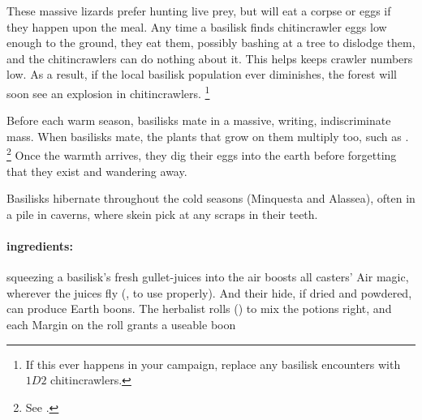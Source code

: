 \begin{multicols}{2}
These massive lizards prefer hunting live prey, but will eat a corpse or eggs if they happen upon the meal.
Any time a basilisk finds chitincrawler eggs low enough to the ground, they eat them, possibly bashing at a tree to dislodge them, and the chitincrawlers can do nothing about it.
This helps keeps crawler numbers low.
As a result, if the local basilisk population ever diminishes, the forest will soon see an explosion in chitincrawlers.%
\footnote{If this ever happens in your campaign, replace any basilisk encounters with $1D2$ chitincrawlers.}

Before each warm season, basilisks mate in a massive, writing, indiscriminate mass.
When basilisks mate, the plants that grow on them multiply too, such as .%
\footnote{See .}
Once the warmth arrives, they dig their eggs into the earth before forgetting that they exist and wandering away.

Basilisks hibernate throughout the cold seasons (\gls{Minquesta} and \gls{Alassea}), often in a pile in caverns, where skein pick at any scraps in their teeth.

\paragraph{\Glspl{ingredient}:}
squeezing a basilisk's fresh gullet-juices into the air boosts all casters' Air magic, wherever the juices fly (, \tn[10] to use properly).
And their hide, if dried and powdered, can produce Earth \glspl{boon}.
The herbalist rolls  (\tn[10]) to mix the potions right, and each Margin on the roll grants a useable \gls{boon}

\showEnc


\end{multicols}
